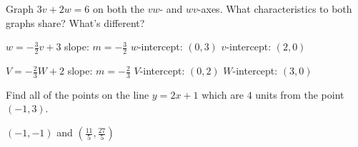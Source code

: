 \documentclass{ximera}
\begin{document}
\begin{problem}
Graph $3v + 2w = 6$ on both the $vw$- and $wv$-axes.  What characteristics to both graphs share?  What's different? 

\begin{solution}

$w = -\frac{3}{2} v + 3$
slope: $m = -\frac{3}{2}$ 
$w$-intercept:  $\left(0, 3\right)$
$v$-intercept:  $\left(2, 0\right)$

$V = -\frac{2}{3} W + 2$
slope: $m = -\frac{2}{3}$ 
$V$-intercept:  $\left(0,2 \right)$
$W$-intercept:  $\left(3,0\right)$
\end{solution}
\end{problem}

\begin{problem}
Find all of the points on the line $y=2x+1$ which are $4$ units from the point $(-1,3)$.

\begin{solution}
    $(-1,-1)$ and $\left(\frac{11}{5}, \frac{27}{5}\right)$
\end{solution}

\end{problem}
\end{document}
